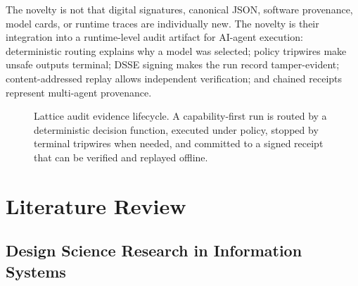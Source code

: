 \documentclass[conference]{IEEEtran}
\begin{document}
The novelty is not that digital signatures, canonical JSON, software
provenance, model cards, or runtime traces are individually new. The novelty is
their integration into a runtime-level audit artifact for AI-agent execution:
deterministic routing explains why a model was selected; policy tripwires make
unsafe outputs terminal; DSSE signing makes the run record tamper-evident;
content-addressed replay allows independent verification; and chained receipts
represent multi-agent provenance.

\begin{figure}[t]
\centering
{}
\caption{Lattice audit evidence lifecycle. A capability-first run is routed by a
deterministic decision function, executed under policy, stopped by terminal
tripwires when needed, and committed to a signed receipt that can be verified
and replayed offline.}
\label{fig:lifecycle}
\end{figure}

\section{Literature Review}

\subsection{Design Science Research in Information Systems}
\end{document}
